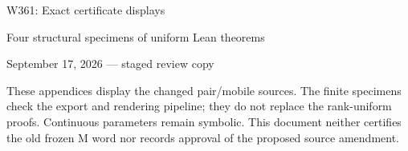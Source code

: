 \documentclass[10pt,letterpaper]{article}
\begin{document}
\begin{center}
{\LARGE W361: Exact certificate displays}\par
{\large Four structural specimens of uniform Lean theorems}\par
September 17, 2026 --- staged review copy
\end{center}
These appendices display the changed pair/mobile sources. The finite specimens
check the export and rendering pipeline; they do not replace the rank-uniform
proofs. Continuous parameters remain symbolic. This document neither certifies
the old frozen M word nor records approval of the proposed source amendment.

\clearpage

\clearpage

\clearpage

\end{document}
